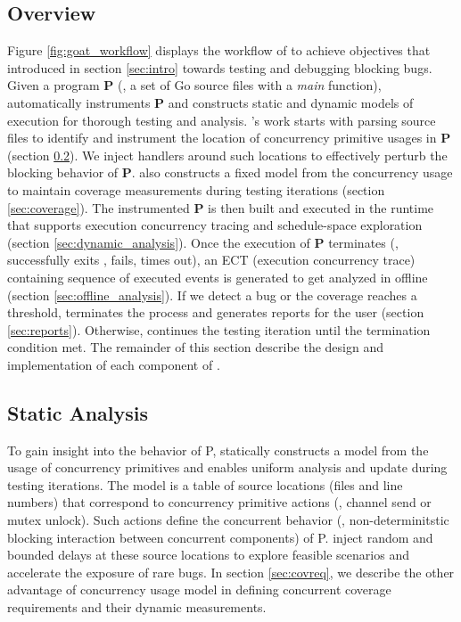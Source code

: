 %
\subsection{Overview}
\label{sec:overview}
Figure \ref{fig:goat_workflow} displays the workflow of \goat to achieve objectives that introduced in section \ref{sec:intro} towards testing and debugging blocking bugs.
%
Given a program \textbf{P} (\ie, a set of Go source files with a \textit{main} function), \goat automatically instruments \textbf{P} and constructs static and dynamic models of execution for thorough testing and analysis.
%
\goat's work starts with parsing source files to identify and instrument the location of concurrency primitive usages in \textbf{P} (section \ref{sec:static_analysis}).
%
We inject \goat handlers around such locations to effectively perturb the blocking behavior of \textbf{P}.
%
\goat also constructs a fixed model from the concurrency usage to maintain coverage measurements during testing iterations (section \ref{sec:coverage}).
%
The instrumented \textbf{P} is then built and executed in the \goat runtime that supports execution concurrency tracing and schedule-space exploration (section \ref{sec:dynamic_analysis}).
%
Once the execution of \textbf{P} terminates (\eg, successfully exits , fails, times out), an ECT (execution concurrency trace) containing sequence of executed events is generated to get analyzed in offline (section \ref{sec:offline_analysis}).
%
If we detect a bug or the coverage reaches a threshold, \goat terminates the process and generates reports for the user (section \ref{sec:reports}). Otherwise, \goat continues the testing iteration until the termination condition met.
%
The remainder of this section describe the design and implementation of each component of \goat.

\subsection{Static Analysis}
\label{sec:static_analysis}
To gain insight into the behavior of P, \goat statically constructs a model from the usage of concurrency primitives and enables uniform analysis and update during testing iterations.
%
The model is a table of source locations (files and line numbers) that correspond to concurrency primitive actions (\eg, channel send or mutex unlock).
%
Such actions define the concurrent behavior (\ie, non-determinitstic blocking interaction between concurrent components) of P.
%
\goat inject random and bounded delays at these source locations to explore feasible scenarios and accelerate the exposure of rare bugs.
%
In section \ref{sec:covreq}, we describe the other advantage of concurrency usage model in defining concurrent coverage requirements and their dynamic measurements.
%

